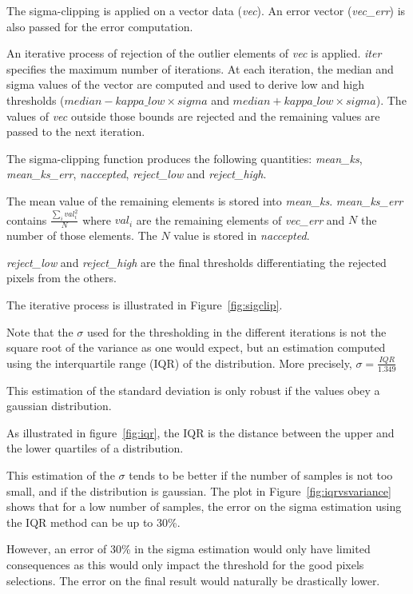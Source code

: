 The sigma-clipping is applied on a vector data ({\it vec}). An error
vector ({\it vec\_err}) is also passed for the error computation.

An iterative process of rejection of the outlier elements of {\it vec} is 
applied. {\it iter} specifies the maximum number of iterations.
At each iteration, the median and sigma values of the vector are computed and 
used to derive low and high thresholds ($median-kappa\_low \times sigma$ 
and $median+kappa\_low \times sigma$). The values of {\it vec} outside those
bounds are rejected and the remaining values are passed to the next
iteration.

The sigma-clipping function produces the following quantities: {\it mean\_ks}, 
{\it mean\_ks\_err}, {\it naccepted}, {\it reject\_low} and {\it reject\_high}.

The mean value of the remaining elements is stored into {\it mean\_ks}.
{\it mean\_ks\_err} contains $\frac{\sum_i{val_i^{2}}}{N}$ where $val_i$
are the remaining elements of {\it vec\_err} and $N$ the number of
those elements. The $N$ value is stored in {\it naccepted}.

{\it reject\_low} and {\it reject\_high} are the final thresholds
differentiating the rejected pixels from the others.

The iterative process is illustrated in Figure~\ref{fig:sigclip}.

  
Note that the $\sigma$ used for the thresholding in the different iterations 
is not the square root of the variance as one would expect, but an 
estimation computed using the interquartile range (IQR) of the distribution. 
More precisely, $\sigma = \frac{IQR}{1.349}$ 
  
This estimation of the standard deviation is only robust if the
values obey a gaussian distribution. 

As illustrated in figure~\ref{fig:iqr}, the IQR is the distance between the 
upper and the lower quartiles of a distribution.


This estimation of the $\sigma$ tends to be better if the number of samples 
is not too small, and if the distribution is gaussian. The plot in
Figure~\ref{fig:iqrvsvariance} shows that for a low number of samples, 
the error on the sigma estimation using the IQR method can be up to 30\%.



However, an error of 30\% in the sigma estimation would only have 
limited consequences as this would only impact the threshold for the good 
pixels selections. The error on the final result would naturally be 
drastically lower.

